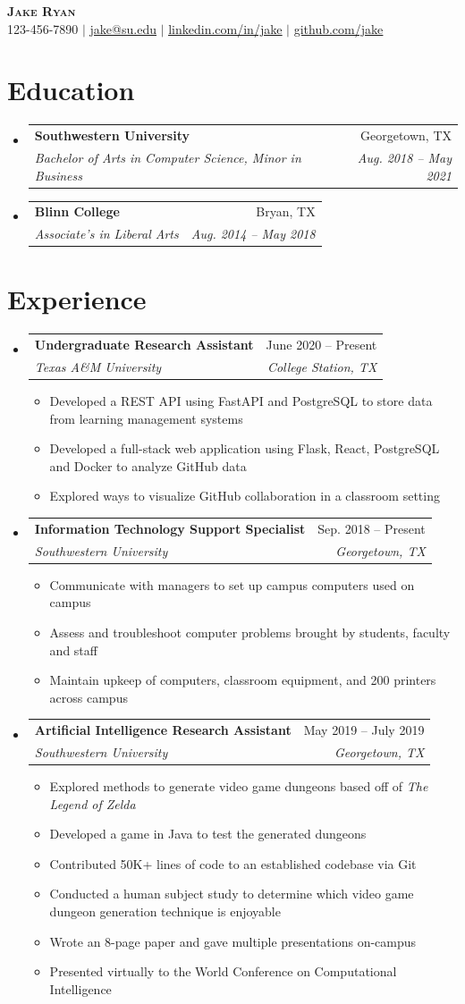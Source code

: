 \documentclass[letterpaper,11pt]{article}
\makeatletter
\newcommand{\resumeItem}[1]{
  \item\small{{#1 \vspace{-2pt}}}
}
\newcommand{\resumeSubheading}[4]{
  \vspace{-2pt}\item
    \begin{tabular*}{0.97\textwidth}[t]{l@{\extracolsep{\fill}}r}
      \textbf{#1} & #2 \\
      \textit{\small#3} & \textit{\small #4} \\
    \end{tabular*}\vspace{-7pt}
}
\newcommand{\resumeSubHeadingListStart}{\begin{itemize}[leftmargin=0.15in, label={}]}
\newcommand{\resumeSubHeadingListEnd}{\end{itemize}}
\newcommand{\resumeItemListStart}{\begin{itemize}}
\newcommand{\resumeItemListEnd}{\end{itemize}\vspace{-5pt}}
\makeatother
\begin{document}
\begin{center}
    \textbf{\Huge \scshape Jake Ryan} \\ \vspace{1pt}
    \small 123-456-7890 $|$ \href{mailto:jake@su.edu}{\underline{jake@su.edu}} $|$ 
    \href{https://linkedin.com/in/jake}{\underline{linkedin.com/in/jake}} $|$
    \href{https://github.com/jake}{\underline{github.com/jake}}
\end{center}

\section{Education}
  \resumeSubHeadingListStart
    \resumeSubheading
      {Southwestern University}{Georgetown, TX}
      {Bachelor of Arts in Computer Science, Minor in Business}{Aug. 2018 -- May 2021}
    \resumeSubheading
      {Blinn College}{Bryan, TX}
      {Associate's in Liberal Arts}{Aug. 2014 -- May 2018}
  \resumeSubHeadingListEnd

\section{Experience}
  \resumeSubHeadingListStart
    \resumeSubheading
      {Undergraduate Research Assistant}{June 2020 -- Present}
      {Texas A\&M University}{College Station, TX}
      \resumeItemListStart
        \resumeItem{Developed a REST API using FastAPI and PostgreSQL to store data from learning management systems}
        \resumeItem{Developed a full-stack web application using Flask, React, PostgreSQL and Docker to analyze GitHub data}
        \resumeItem{Explored ways to visualize GitHub collaboration in a classroom setting}
      \resumeItemListEnd

    \resumeSubheading
      {Information Technology Support Specialist}{Sep. 2018 -- Present}
      {Southwestern University}{Georgetown, TX}
      \resumeItemListStart
        \resumeItem{Communicate with managers to set up campus computers used on campus}
        \resumeItem{Assess and troubleshoot computer problems brought by students, faculty and staff}
        \resumeItem{Maintain upkeep of computers, classroom equipment, and 200 printers across campus}
      \resumeItemListEnd

    \resumeSubheading
      {Artificial Intelligence Research Assistant}{May 2019 -- July 2019}
      {Southwestern University}{Georgetown, TX}
      \resumeItemListStart
        \resumeItem{Explored methods to generate video game dungeons based off of \emph{The Legend of Zelda}}
        \resumeItem{Developed a game in Java to test the generated dungeons}
        \resumeItem{Contributed 50K+ lines of code to an established codebase via Git}
        \resumeItem{Conducted a human subject study to determine which video game dungeon generation technique is enjoyable}
        \resumeItem{Wrote an 8-page paper and gave multiple presentations on-campus}
        \resumeItem{Presented virtually to the World Conference on Computational Intelligence}
      \resumeItemListEnd
  \resumeSubHeadingListEnd
\end{document}
